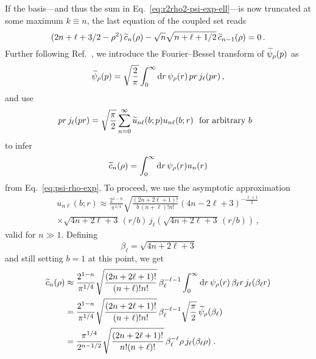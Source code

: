   If the basis---and thus the sum in Eq.~\eqref{eq:r2rho2-psi-exp-ell}---is now
  truncated at some maximum $k \equiv n$, the last
  equation of the coupled set reads
  \begin{equation}
   (2n+\ell+3/2-\rho^2)\,\widetilde{c}_{n}(\rho)
   - \sqrt{n}\sqrt{n+\ell+1/2}\,\widetilde{c}_{n-1}(\rho) = 0 \,.
  \label{eq:quant-cond-ell}
  \end{equation}
  Further following Ref.~\cite{Furnstahl:2013vda}, we introduce the
  Fourier--Bessel transform of $\widetilde{\psi}_\rho(p)$ as
  \begin{equation}
   \widetilde{\psi}_\rho(p)
   = \sqrt{\frac{2}{\pi}}\int_0^\infty \mathrm{d} r\,\psi_\rho(r)\,pr\,j_\ell(pr) \,,
  \label{eq:psi-tilde-psi}
  \end{equation}
  and use
  \begin{equation}
   pr\,j_\ell(pr) = \sqrt{\frac{\pi}{2}}\sum_{n=0}^\infty
   \widetilde{u}_{n\ell}(b;p)u_{n\ell}(b;r) \ \ \text{for arbitrary $b$}\ \ 
  \label{eq:j-uKuR}
  \end{equation}
  to infer
  \begin{equation}
   \widetilde{c}_n(\rho) = \int_0^\infty\mathrm{d} r\,\psi_\rho(r) u_n(r)
  \label{eq:c-tilde-1}
  \end{equation}
  from Eq.~\eqref{eq:psi-rho-exp}.  To proceed, we use the asymptotic
  approximation~\cite{Furnstahl:2013vda,Deano2013}
  \begin{multline}
   u_{n\ell}(b;r) \approx
   \frac{2^{1-n}}{\pi^{1/4}} \sqrt{\frac{(2n+2\ell+1)!}{b\,(n+\ell)!n!}}
   (4n-2\ell+3)^{-\frac{\ell+1}{2}} \\
   \times\sqrt{4n+2\ell+3}\,(r/b)\,j_\ell\left(\sqrt{4n+2\ell+3}\,(r/b)\right)
   \,,
  \label{eq:uR-asympt}
  \end{multline}
  valid for $n\gg 1$.  Defining
  \begin{equation}
   \beta_\ell = \sqrt{4n+2\ell+3}
  \label{eq:beta-ell}
  \end{equation}
  and still setting $b=1$ at this point, we get
  \begin{equation}
  \begin{split}
   \widetilde{c}_n(\rho) &\approx
   \frac{2^{1-n}}{\pi^{1/4}} \sqrt{\frac{(2n+2\ell+1)!}{(n+\ell)!n!}}
   \, \beta_\ell^{-\ell-1}\int_0^\infty\mathrm{d} r\,\psi_\rho(r)\,
   \beta_\ell r \, j_\ell(\beta_\ell r) \\
   &= \frac{2^{1-n}}{\pi^{1/4}} \sqrt{\frac{(2n+2\ell+1)!}{(n+\ell)!n!}}
   \, \beta_\ell^{-\ell-1} \sqrt{\frac\pi2}\,\widetilde{\psi}_\rho(\beta_\ell) \\
   &= \frac{\pi^{1/4}}{2^{n-1/2}}\sqrt{\frac{(2n+2\ell+1)!}{n!(n+\ell)!}}
   \, \beta_\ell^{-\ell} \rho\,j_\ell(\beta_\ell\rho)
   \;.
  \end{split}
  \label{eq:c-tilde-2}
  \end{equation}
